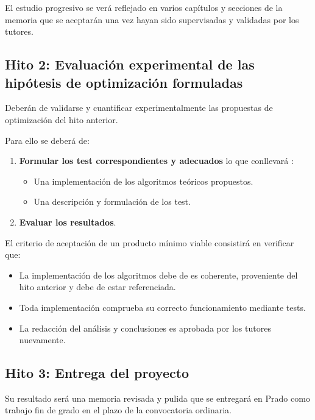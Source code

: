 El estudio progresivo se verá reflejado en varios capítulos y secciones de la memoria
que se aceptarán una vez hayan sido supervisadas y validadas por los tutores. 

\subsection*{Hito 2: Evaluación experimental de las hipótesis de optimización formuladas}

Deberán de validarse y cuantificar experimentalmente las propuestas de optimización del hito anterior. 

Para ello  se deberá de: 
\begin{enumerate}
    \item \textbf{Formular los test correspondientes y adecuados} lo que conllevará : 
    \begin{itemize}
        \item Una implementación de los algoritmos teóricos propuestos.
        \item Una descripción y formulación de los test.
    \end{itemize}

    \item \textbf{Evaluar los resultados}. 
\end{enumerate}

El criterio de aceptación de un producto mínimo viable consistirá en verificar que:
\begin{itemize}
    \item La implementación de los algoritmos debe de es coherente, proveniente del hito anterior y debe de estar referenciada.
    \item  Toda implementación comprueba su correcto funcionamiento mediante tests.
    \item La redacción del análisis y conclusiones es aprobada por los tutores nuevamente.
\end{itemize}




\subsection*{Hito 3: Entrega del proyecto}

Su resultado será una memoria revisada y pulida que se entregará en Prado como trabajo fin de grado en el plazo de la convocatoria ordinaria. 

